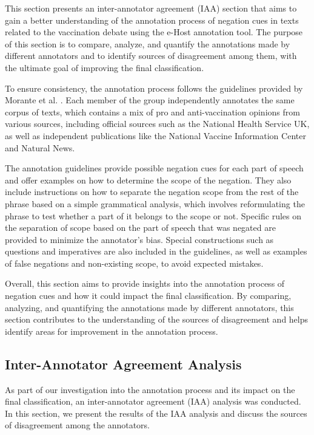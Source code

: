 This section presents an inter-annotator agreement (IAA) section that aims to gain a better understanding of the annotation process of negation cues in texts related to the vaccination debate using the e-Host annotation tool. The purpose of this section is to compare, analyze, and quantify the annotations made by different annotators and to identify sources of disagreement among them, with the ultimate goal of improving the final classification.

To ensure consistency, the annotation process follows the guidelines provided by Morante et al. \cite{morante2011annotation}. Each member of the group independently annotates the same corpus of texts, which contains a mix of pro and anti-vaccination opinions from various sources, including official sources such as the National Health Service UK, as well as independent publications like the National Vaccine Information Center and Natural News.

The annotation guidelines provide possible negation cues for each part of speech and offer examples on how to determine the scope of the negation. They also include instructions on how to separate the negation scope from the rest of the phrase based on a simple grammatical analysis, which involves reformulating the phrase to test whether a part of it belongs to the scope or not. Specific rules on the separation of scope based on the part of speech that was negated are provided to minimize the annotator's bias. Special constructions such as questions and imperatives are also included in the guidelines, as well as examples of false negations and non-existing scope, to avoid expected mistakes.

Overall, this section aims to provide insights into the annotation process of negation cues and how it could impact the final classification. By comparing, analyzing, and quantifying the annotations made by different annotators, this section contributes to the understanding of the sources of disagreement and helps identify areas for improvement in the annotation process.

\subsection*{Inter-Annotator Agreement Analysis}
As part of our investigation into the annotation process and its impact on the final classification, an inter-annotator agreement (IAA) analysis was conducted. In this section, we present the results of the IAA analysis and discuss the sources of disagreement among the annotators.

